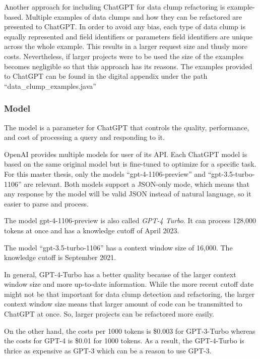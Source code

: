 Another approach for including ChatGPT for data clump refactoring is example-based. Multiple examples of data clumps and how they can be refactored are presented to ChatGPT. In order to avoid any bias, each type of data clump is equally represented and field identifiers or parameters field identifiers are unique across the whole example. This results in a larger request size and thusly more costs. Nevertheless, if larger projects were to be used the size of the examples becomes negligible so that this approach has its reasons. The examples provided to ChatGPT can be found in the digital appendix under the path \enquote{data\_clump\_examples.java} 

\subsubsection{Model}
The model is a parameter for ChatGPT that controls the quality, performance, and cost of processing a query and responding to it. 

OpenAI provides multiple models for user of its API. Each  ChatGPT model  is based on the same original model but is fine-tuned to optimize for a specific task. For this master thesis, only  the  models \enquote{gpt-4-1106-preview} and \enquote{gpt-3.5-turbo-1106} are relevant. Both models support a \ac{JSON}-only mode, which means that any response by the model will be valid \ac{JSON} instead of natural language, so it easier to parse and process. \cite{chatgpt_new_models}

The model {gpt-4-1106-preview} is also called \textit{GPT-4 Turbo}. It can process 128,000 tokens at once and has a knowledge cutoff of April 2023. \cite{chatgpt_new_models}

The model \enquote{gpt-3.5-turbo-1106} has a context window size of 16,000. The knowledge cutoff is September 2021. \cite{chatgpt_new_models}


In general, GPT-4-Turbo has a better quality because of the larger context window size and more up-to-date information. While the more recent cutoff date might not be that important for data clump detection and refactoring, the larger context window size means that larger amount of code can be transmitted to ChatGPT at once. So, larger projects can be refactored more easily.  \cite{chatgpt_new_models}

On the other hand, the costs per 1000 tokens is  \$0.003 for GPT-3-Turbo whereas the costs for GPT-4 is \$0.01 for 1000 tokens. As a result, the GPT-4-Turbo is thrice as expensive as GPT-3 which can be a reason to use GPT-3. \cite{chatgpt_new_models}

